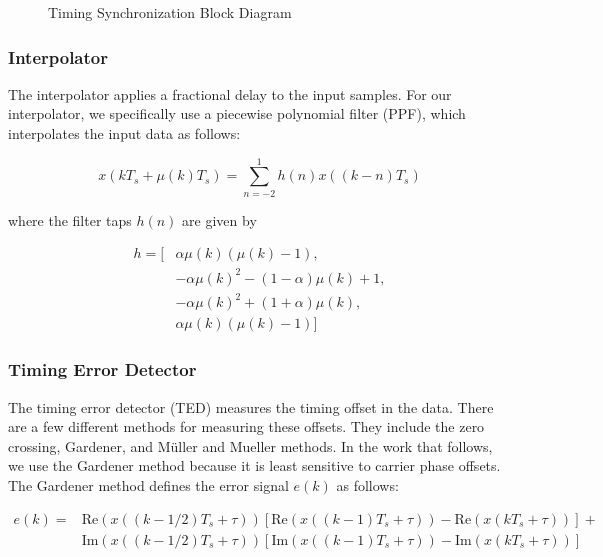 \documentclass[conference,onecolumn]{IEEEtran}
\begin{document}
\begin{figure}[H]
	\centerline{}
	\caption{Timing Synchronization Block Diagram}
	\label{fig::timing_synchronization}
\end{figure}

\subsubsection{Interpolator}

\noindent The interpolator applies a fractional delay to the input samples. For our interpolator, we specifically use a piecewise polynomial filter (PPF), which interpolates the input data as follows:

\begin{equation}
	x(kT_s + \mu(k)T_s) = \sum_{n=-2}^{1}{h(n)x((k-n)T_s)}
\end{equation}

\noindent where the filter taps $h(n)$ are given by

\begin{equation}
\begin{split}
	h = [&\alpha\mu(k)(\mu(k) - 1), \\
	&-\alpha\mu(k)^2 - (1-\alpha)\mu(k) + 1,\\
	&-\alpha\mu(k)^2 + (1+\alpha)\mu(k),\\
	&\alpha\mu(k)(\mu(k) - 1)]
\end{split}
\end{equation}

\subsubsection{Timing Error Detector}

\noindent The timing error detector (TED) measures the timing offset in the data. There are a few different methods for measuring these offsets. They include the zero crossing, Gardener, and  M\"{u}ller and Mueller methods. In the work that follows, we use the Gardener method because it is least sensitive to carrier phase offsets. The Gardener method defines the error signal $e(k)$ as follows:

\begin{equation}
\begin{split}
	e(k) =& \text{Re}(x((k-1/2)T_s+\tau))\left[\text{Re}(x((k-1)T_s + \tau)) - \text{Re}(x(kT_s + \tau))\right] + \\
	&\text{Im}(x((k-1/2)T_s+\tau))\left[\text{Im}(x((k-1)T_s+\tau)) -\text{Im}(x(kT_s+\tau))\right]
\end{split}
\end{equation}
\end{document}

